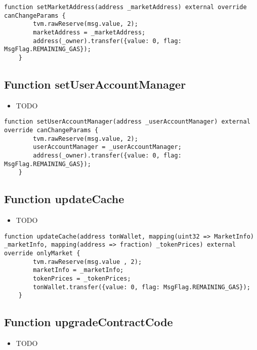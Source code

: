 \begin{lstlisting}[firstnumber=67]
    function setMarketAddress(address _marketAddress) external override canChangeParams {
        tvm.rawReserve(msg.value, 2);
        marketAddress = _marketAddress;
        address(_owner).transfer({value: 0, flag: MsgFlag.REMAINING_GAS});
    }
\end{lstlisting}

\subsection{Function setUserAccountManager}

\noindent\begin{itemize}
\item TODO
\end{itemize}

\begin{lstlisting}[firstnumber=73]
    function setUserAccountManager(address _userAccountManager) external override canChangeParams {
        tvm.rawReserve(msg.value, 2);
        userAccountManager = _userAccountManager;
        address(_owner).transfer({value: 0, flag: MsgFlag.REMAINING_GAS});
    }
\end{lstlisting}

\subsection{Function updateCache}

\noindent\begin{itemize}
\item TODO
\end{itemize}

\begin{lstlisting}[firstnumber=83]
    function updateCache(address tonWallet, mapping(uint32 => MarketInfo) _marketInfo, mapping(address => fraction) _tokenPrices) external override onlyMarket {
        tvm.rawReserve(msg.value , 2);
        marketInfo = _marketInfo;
        tokenPrices = _tokenPrices;
        tonWallet.transfer({value: 0, flag: MsgFlag.REMAINING_GAS});
    }
\end{lstlisting}

\subsection{Function upgradeContractCode}

\noindent\begin{itemize}
\item TODO
\end{itemize}

